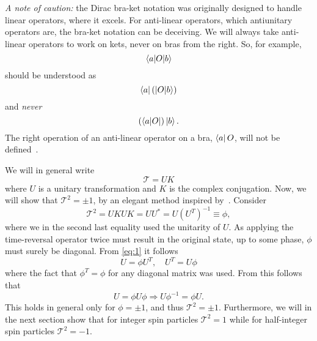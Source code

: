 \emph{A note of caution:} the Dirac bra-ket notation was originally designed to handle linear operators, where it excels.
For anti-linear operators, which antiunitary operators are, the bra-ket notation can be deceiving.
We will always take anti-linear operators to work on kets, never on bras from the right.
So, for example,
$$ \braket{a| O | b} $$
should be understood as
$$ \bra{a} \left(\ket{O |b}\right)$$
and \emph{never}
$$ \left(\bra{a|O}\right) \ket{b}.$$
The right operation of an anti-linear operator on a bra, $\bra{a} O$, will not be defined~\cite[discussion based on][Ch.~4.4]{sakuraiModernQuantumMechanics2017}.

We will in general write
\begin{equation}
  \label{eq:time-rev-def}
  \mathcal{T} = U K
\end{equation}
where $U$ is a unitary transformation and $K$ is the complex conjugation.
Now, we will show that $\mathcal{T}^2 = \pm 1$, by an elegant method inspired by~\textcite{bernevigTopologicalInsulatorsTopological2013}.
Consider
\begin{equation}
  \label{eq:1}
  \mathcal{T}^2 = UKUK = UU^* = U(U^T)^{-1} \equiv \phi,
\end{equation}
where we in the second last equality used the unitarity of $U$.
As applying the time-reversal operator twice must result in the original state, up to some phase, $\phi$ must surely be diagonal.
From \cref{eq:1} it follows
\begin{equation}
  U = \phi U^T, \quad U^T = U \phi
\end{equation}
where the fact that $\phi^T = \phi$ for any diagonal matrix was used.
From this follows that
\begin{equation}
  U = \phi U \phi \Rightarrow U \phi^{-1} = \phi U.
\end{equation}
This holds in general only for $\phi = \pm 1$, and thus $\mathcal{T}^2 = \pm 1$.
Furthermore, we will in the next section show that for integer spin particles $\mathcal{T}^2 = 1$ while for half-integer spin particles $\mathcal{T}^2 = -1$.

